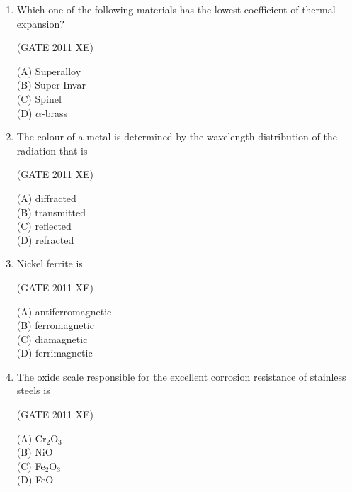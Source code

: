 \documentclass[journal,12pt,onecolumn]{IEEEtran}
\begin{document}
\begin{enumerate}
\hfill{(GATE 2011 XE)}\\
\begin{multicols}{4}
(A) 125000 \\
(B) 119000 \\
(C) 56000 \\
(D) 2000
\end{multicols}

\item Which one of the following materials has the lowest coefficient of thermal expansion?

\hfill{(GATE 2011 XE)}\\
\begin{multicols}{4}
(A) Superalloy \\
(B) Super Invar \\
(C) Spinel \\
(D) $\alpha$-brass
\end{multicols}


\item The colour of a metal is determined by the wavelength distribution of the radiation that is

\hfill{(GATE 2011 XE)}\\
\begin{multicols}{4}
(A) diffracted \\
(B) transmitted \\
(C) reflected \\
(D) refracted
\end{multicols}

\newpage

\item Nickel ferrite is

\hfill{(GATE 2011 XE)}\\
\begin{multicols}{4}
(A) antiferromagnetic \\
(B) ferromagnetic \\
(C) diamagnetic \\
(D) ferrimagnetic
\end{multicols}

\item The oxide scale responsible for the excellent corrosion resistance of stainless steels is

\hfill{(GATE 2011 XE)}\\
\begin{multicols}{4}
(A) Cr$_2$O$_3$ \\
(B) NiO \\
(C) Fe$_2$O$_3$ \\
(D) FeO
\end{multicols}


\end{enumerate}
\end{document}
